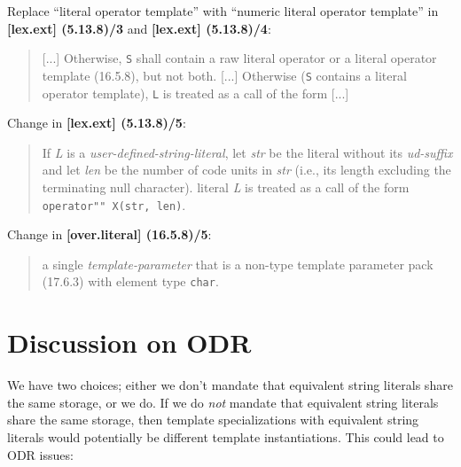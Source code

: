 \documentclass{wg21}
\newcommand{\cc}[1]{\texttt{#1}}
\begin{document}
Replace ``literal operator template'' with ``numeric literal operator template''
in \textbf{[lex.ext] (5.13.8)/3} and \textbf{[lex.ext] (5.13.8)/4}:

\begin{quote}
  [...] Otherwise, \cc{S} shall contain a raw literal operator or a
   literal operator template (16.5.8), but not both. [...]
  Otherwise (\cc{S} contains a  literal operator template),
  \cc{L} is treated as a call of the form [...]
\end{quote}

Change in \textbf{[lex.ext] (5.13.8)/5}:

\begin{quote}
  If \textit{L} is a \textit{user-defined-string-literal}, let \textit{str} be
  the literal without its \textit{ud-suffix} and let \textit{len} be the number
  of code units in \textit{str} (i.e., its length excluding the terminating
  null character).
   literal \textit{L} is treated as a call of the form
  \texttt{operator"" X(str, len)}.
\end{quote}

Change in \textbf{[over.literal] (16.5.8)/5}:

\begin{quote}
    a single
  \textit{template-parameter} that is a non-type template parameter pack (17.6.3)
  with element type \texttt{char}. 
\end{quote}


\section{Discussion on ODR}
We have two choices; either we don't mandate that equivalent string literals
share the same storage, or we do. If we do \textit{not} mandate that equivalent
string literals share the same storage, then template specializations with
equivalent string literals would potentially be different template
instantiations. This could lead to ODR issues:
\end{document}

